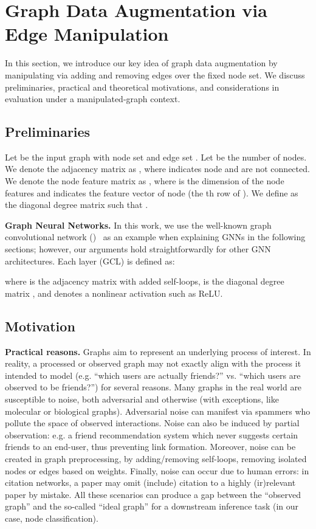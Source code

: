 \documentclass[letterpaper]{article} \usepackage{aaai21}  \usepackage{times}  \usepackage{helvet} \usepackage{courier}  \usepackage[hyphens]{url}  \usepackage{graphicx} \urlstyle{rm} \def\UrlFont{\rm}  \usepackage{natbib}  \usepackage{caption} \frenchspacing  \setlength{\pdfpagewidth}{8.5in}  \setlength{\pdfpageheight}{11in}
\begin{document}
 
\section{Graph Data Augmentation via\\ Edge Manipulation}
\label{sec:edgemanip}
In this section, we introduce our key idea of graph data augmentation by manipulating  via adding and removing edges over the fixed node set.  We discuss preliminaries, practical and theoretical motivations, and considerations in evaluation under a manipulated-graph context.

\subsection{Preliminaries}
Let  be the input graph with node set  and edge set . Let  be the number of nodes. We denote the adjacency matrix as , where  indicates node  and  are not connected. We denote the node feature matrix as , where  is the dimension of the node features and  indicates the feature vector of node  (the th row of ). We define  as the diagonal degree matrix such that .


\noindent \textbf{Graph Neural Networks.} In this work, we use the well-known graph convolutional network (\gcn)~\cite{kipf2016semi} as an example when explaining GNNs in the following sections; however, our arguments hold straightforwardly for other GNN architectures. Each \gcn layer (GCL) is defined as:

where  is the adjacency matrix with added self-loops,   is the diagonal degree matrix  , and  denotes a nonlinear activation such as ReLU.

\subsection{Motivation}

\noindent \textbf{Practical reasons.} Graphs aim to represent an underlying process of interest.  In reality, a processed or observed graph may not exactly align with the process it intended to model (e.g. ``which users are actually friends?'' vs. ``which users are observed to be friends?'') for several reasons. Many graphs in the real world are susceptible to noise, both adversarial and otherwise (with exceptions, like molecular or biological graphs).  Adversarial noise can manifest via spammers who pollute the space of observed interactions.  Noise can also be induced by partial observation: e.g. a friend recommendation system which never suggests certain friends to an end-user, thus preventing link formation.  Moreover, noise can be created in graph preprocessing, by adding/removing self-loops, removing isolated nodes or edges based on weights.  Finally, noise can occur due to human errors: in citation networks, a paper may omit (include) citation to a highly (ir)relevant paper by mistake.  All these scenarios can produce a gap between the ``observed graph'' and the so-called ``ideal graph'' for a downstream inference task (in our case, node classification).
\end{document}
